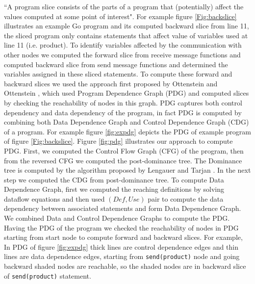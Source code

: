 ``A program slice consists of the parts of a program that (potentially) affect the values computed at some point of interest"\cite{Tip}. For example figure \ref{Fig:backslice} illustrates an example Go program and its computed backward slice from line 11, the sliced program only contains statements that affect value of variables used at line 11 (i.e. product). To identify variables affected by the communication with other nodes we computed the forward slice from receive message functions and computed backward slice from send message functions and determined the variables assigned in these sliced statements. To compute these forward and backward slices we used the approach first proposed by Ottenstein and Ottenstein \cite{PDG}, which used Program Dependence Graph (PDG) and computed slices by checking the reachability of nodes in this graph. PDG captures both control dependency and data dependency of the program, in fact PDG is computed by combining both Data Dependence Graph and Control Dependence Graph (CDG) of a program. For example figure \ref{fig:expdg} depicts the PDG of example program of figure \ref{Fig:backslice}. Figure \ref{fig:pdg} illustrates our approach to compute PDG. First, we computed the Control Flow Graph (CFG) of the program, then from the reversed CFG we computed the post-dominance tree. The Dominance tree is computed by the algorithm proposed by Lengauer and Tarjan \cite{Dom}. In the next step we computed the CDG from post-dominance tree. To compute Data Dependence Graph, first we computed the reaching definitions by solving dataflow equations\cite{dragonbook} and then used $(Def,Use)$ pair to compute the data dependency between associated statements and form Data Dependence Graph. We combined Data and Control Dependence Graphs to compute the PDG. Having the PDG of the program we checked the reachability of nodes in PDG starting from start node to compute forward and backward slices. For example, In PDG of figure \ref{fig:expdg} thick lines are control dependence edges and thin lines are data dependence edges, starting from \texttt{send(product)} node and going backward shaded nodes are reachable, so the shaded nodes are in backward slice of \texttt{send(product)} statement.




